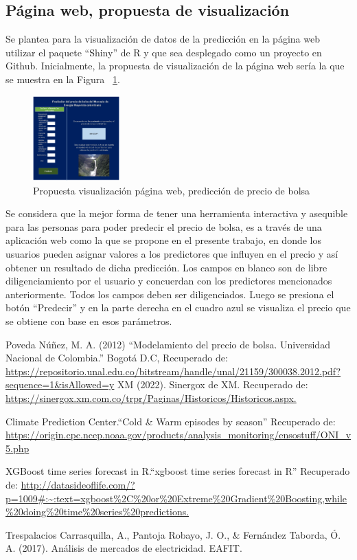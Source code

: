 \documentclass[conference, 10pt]{IEEEtran}
\begin{document}
\subsection{Página web, propuesta de visualización} \label{sec:web}
Se plantea para la visualización de datos de la predicción en la página web utilizar el paquete ``Shiny'' de R y que sea desplegado como un proyecto en Github. Inicialmente, la propuesta de visualización de la página web sería la que se muestra en la Figura ~\ref{fig1}.

\begin{figure}[htbp]
\centerline{\includegraphics[width=0.3\textwidth]{../Images/Propuesta_webpage.PNG}}
\caption{Propuesta visualización página web, predicción de precio de bolsa}
\label{fig1}
\end{figure}

Se considera que la mejor forma de tener una herramienta interactiva y asequible para las personas para poder predecir el precio de bolsa, es a través de una aplicación web como la que se propone en el presente trabajo, en donde los usuarios pueden asignar valores a los predictores que influyen en el precio y así obtener un resultado de dicha predicción. Los campos en blanco son de libre diligenciamiento por el usuario y concuerdan con los predictores mencionados anteriormente. Todos los campos deben ser diligenciados. Luego se presiona el botón ``Predecir'' y en la parte derecha en el cuadro azul se visualiza el precio que se obtiene con base en esos parámetros.

\nocite{*}



\begin{thebibliography}{00}
 Poveda Núñez, M. A. (2012) “Modelamiento del precio de bolsa. Universidad Nacional de Colombia.” Bogotá D.C, Recuperado de: \url{https://repositorio.unal.edu.co/bitstream/handle/unal/21159/300038.2012.pdf?sequence=1&isAllowed=y}
 XM (2022). Sinergox de XM. Recuperado de: \url{ https://sinergox.xm.com.co/trpr/Paginas/Historicos/Historicos.aspx.} 

Climate Prediction Center.“Cold \& Warm episodes by season” Recuperado de: \url{https://origin.cpc.ncep.noaa.gov/products/analysis_monitoring/ensostuff/ONI_v5.php}

XGBoost time series forecast in R.“xgboost time series forecast in R” Recuperado de: \url{http://datasideoflife.com/?p=1009#:~:text=xgboost\%2C\%20or\%20Extreme\%20Gradient\%20Boosting,while\%20doing\%20time\%20series\%20predictions.}

Trespalacios Carrasquilla, A., Pantoja Robayo, J. O., \& Fernández Taborda, Ó. A. (2017). Análisis de mercados de electricidad. EAFIT.

\end{thebibliography}
\end{document}
